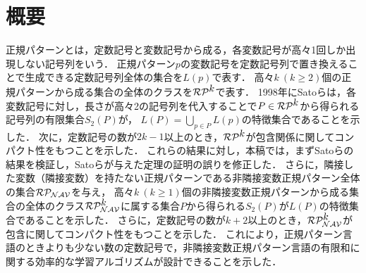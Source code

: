 \section*{概要}
正規パターンとは，定数記号と変数記号から成る，各変数記号が高々1回しか出現しない記号列をいう．
正規パターン$p$の変数記号を定数記号列で置き換えることで生成できる定数記号列全体の集合を$L(p)$で表す．
高々$k~(k\geq 2)$個の正規パターンから成る集合の全体のクラスを$\mathcal{RP^{\mbox{$k$}}}$で表す．
1998年にSatoら\cite{Sato1}は，各変数記号に対し，長さが高々2の記号列を代入することで$P\in \mathcal{RP^{\mbox{$k$}}}$から得られる記号列の有限集合$S_2(P)$が，
$L(P)=\bigcup_{p\in P}L(p)$の特徴集合であることを示した．
次に，定数記号の数が$2k-1$以上のとき，$\mathcal{RP^{\mbox{$k$}}}$が包含関係に関してコンパクト性をもつことを示した．
これらの結果に対し，本稿では，まずSatoら\cite{Sato1}の結果を検証し，Satoらが与えた定理の証明の誤りを修正した．
さらに，隣接した変数（隣接変数）を持たない正規パターンである非隣接変数正規パターン全体の集合$\mathcal{RP_{NAV}}$を与え，
高々$k~(k\ge 1)$個の非隣接変数正規パターンから成る集合の全体のクラス$\mathcal{RP^{\mbox{$k$}}_{NAV}}$に属する集合$P$から得られる$S_2(P)$が$L(P)$の特徴集合であることを示した．
さらに，定数記号の数が$k+2$以上のとき，$\mathcal{RP^{\mbox{$k$}}_{NAV}}$が包含に関してコンパクト性をもつことを示した．
これにより，正規パターン言語のときよりも少ない数の定数記号で，非隣接変数正規パターン言語の有限和に関する効率的な学習アルゴリズムが設計できることを示した．

